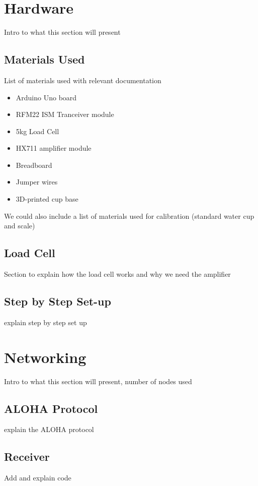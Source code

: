 \documentclass{article}
\begin{document}
\section{Hardware}
Intro to what this section will present

\subsection{Materials Used}
List of materials used with relevant documentation

\begin{itemize}
  \item Arduino Uno board
  \item RFM22 ISM Tranceiver module
  \item 5kg Load Cell
  \item HX711 amplifier module
  \item Breadboard
  \item Jumper wires
  \item 3D-printed cup base
\end{itemize}

We could also include a list of materials used for calibration (standard water cup and scale)

\subsection{Load Cell}
Section to explain how the load cell works and why we need the amplifier

\subsection{Step by Step Set-up}
explain step by step set up 

\section{Networking}
Intro to what this section will present, number of nodes used 

\subsection{ALOHA Protocol}
explain the ALOHA protocol

\subsection{Receiver}
Add and explain code 
\end{document}
